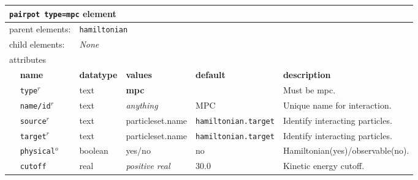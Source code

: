 \FloatBarrier
\begin{table}[h]
\begin{center}
\begin{tabularx}{\textwidth}{l l l l l l }
\hline
\multicolumn{6}{l}{\texttt{pairpot type=mpc} element} \\
\hline
\multicolumn{2}{l}{parent elements:} & \multicolumn{4}{l}{\texttt{hamiltonian}}\\
\multicolumn{2}{l}{child  elements:} & \multicolumn{4}{l}{\textit{None}}\\
\multicolumn{2}{l}{attributes}  & \multicolumn{4}{l}{}\\
   &   \bfseries name     & \bfseries datatype & \bfseries values & \bfseries default   & \bfseries description \\
   & \texttt{type}$^r$    &  text              & \textbf{mpc}     &                     & Must be mpc.         \\
   & \texttt{name/id}$^r$ &  text              & \textit{anything}&  MPC                & Unique name for interaction. \\
   & \texttt{source}$^r$  &  text              & particleset.name &\texttt{hamiltonian.target}& Identify interacting particles.\\
   & \texttt{target}$^r$  &  text              & particleset.name &\texttt{hamiltonian.target}& Identify interacting particles.  \\
   & \texttt{physical}$^o$&  boolean           & yes/no           & no                  & Hamiltonian(yes)/observable(no). \\
   &   \texttt{cutoff}    &  real              & \textit{positive real}& 30.0           & Kinetic energy cutoff. \\
  \hline
\end{tabularx}
\end{center}
\end{table}
